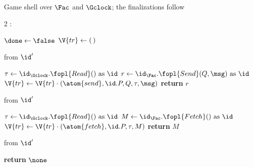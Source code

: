 \documentclass[10pt,oneside,openany]{book}
\theoremstyle{accentdef}
\theoremstyle{accentplain}
\begin{document}
\begin{interface}[nofloat]{Game shell over $\Fac$ and $\Gclock$; the finalizations follow \\
}

{\scriptsize
\setlength{\columnsep}{1.4em}
\begin{multicols}{2}
:
\begin{algorithmic}[1]
\setcounter{contline}{0}\algcont
\State $\done \gets \false$
\State $\V{tr} \gets (\,)$
\algsave
\end{algorithmic}
\vspace{1.4ex}

 \quad from $\id'$
\begin{algorithmic}[1]
\algcont
\Req{$\neg\done$}
\State $\tau \gets \id_{\Gclock}.\fopl{Read}() \text{ as } \id$
\State $r \gets \id_{\Fac}.\fopl{Send}(Q,\msg) \text{ as } \id$ \label{ln:gacsend}
\State $\V{tr} \gets \V{tr} \cdot (\atom{send},\id.P,Q,\tau,\msg)$
\State \textbf{return} $r$
\algsave
\end{algorithmic}
\vspace{1.4ex}

\columnbreak

 \quad from $\id'$
\begin{algorithmic}[1]
\algcont
\Req{$\neg\done$}
\State $\tau \gets \id_{\Gclock}.\fopl{Read}() \text{ as } \id$
\State $M \gets \id_{\Fac}.\fopl{Fetch}() \text{ as } \id$ \label{ln:gacfetch}
\State $\V{tr} \gets \V{tr} \cdot (\atom{fetch},\id.P,\tau,M)$
\State \textbf{return} $M$
\algsave
\end{algorithmic}
\vspace{1.4ex}

 \quad from $\id'$
\begin{algorithmic}[1]
\algcont
\State \textbf{return} $\none$
\algsave
\end{algorithmic}
\vspace{1.4ex}

\end{multicols}}
\end{interface}
\end{document}
